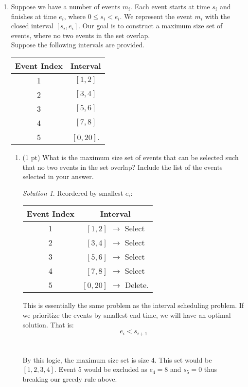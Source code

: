 \documentclass[12pt]{article}
\theoremstyle{remark}
\newtheorem*{solution}{Solution}
\begin{document}
\hrulefill

\newpage
\begin{enumerate}



\item Suppose we have a number of events $m_{i}$. Each event starts at time $s_{i}$ and finishes at time $e_{i}$, where $0 \leq s_{i} < e_{i}$. We represent the event $m_{i}$ with the closed interval $[s_{i}, e_{i}].$ Our goal is to construct a maximum size set of events, where no two events in the set overlap. \\

\noindent Suppose the following intervals are provided.
\begin{center}
\begin{tabular}{c|c}
Event Index & Interval \\ \hline
1 & $[1, 2]$ \\ 
2 & $[3, 4]$ \\
3 & $[5, 6]$ \\
4 & $[7, 8]$ \\
5 & $[0, 20]$.
\end{tabular}
\end{center}

\begin{enumerate}[label=(\alph*)]
\item (1 pt) What is the maximum size set of events that can be selected such that no two events in the set overlap? Include the list of the events selected in your answer.\\
\begin{solution}
Reordered by smallest $e_i$:
\begin{center}
\begin{tabular}{c|c}
Event Index & Interval \\ \hline
1 & $[1, 2]$ $\rightarrow$ Select\\ 
2 & $[3, 4]$ $\rightarrow$ Select\\
3 & $[5, 6]$ $\rightarrow$ Select\\
4 & $[7, 8]$ $\rightarrow$ Select\\
5 & $[0, 20]$ $\rightarrow$ Delete.
\end{tabular}
\end{center}
This is essentially the same problem as the interval scheduling problem. If we prioritize the events by smallest end time, we will have an optimal solution. That is: $$e_i < s_{i+1}$$ \\\\By this logic, the maximum size set is size 4. This set would be $[1,2,3,4]$. Event 5 would be excluded as $e_4 = 8$ and $s_5  = 0$ thus breaking our greedy rule above.
\end{solution}


\end{enumerate}
\end{enumerate}
\end{document}
